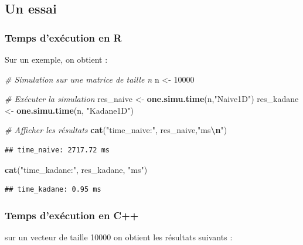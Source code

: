 \documentclass[
]{article}
\newenvironment{Shaded}{\begin{snugshade}}{\end{snugshade}}
\newcommand{\CommentTok}[1]{\textcolor[rgb]{0.56,0.35,0.01}{\textit{#1}}}
\newcommand{\DecValTok}[1]{\textcolor[rgb]{0.00,0.00,0.81}{#1}}
\newcommand{\FunctionTok}[1]{\textcolor[rgb]{0.13,0.29,0.53}{\textbf{#1}}}
\newcommand{\NormalTok}[1]{#1}
\newcommand{\OtherTok}[1]{\textcolor[rgb]{0.56,0.35,0.01}{#1}}
\newcommand{\SpecialCharTok}[1]{\textcolor[rgb]{0.81,0.36,0.00}{\textbf{#1}}}
\newcommand{\StringTok}[1]{\textcolor[rgb]{0.31,0.60,0.02}{#1}}
\begin{document}
\subsection{Un essai}\label{un-essai}

\subsubsection{Temps d'exécution en R}\label{temps-dexuxe9cution-en-r}

Sur un exemple, on obtient :

\begin{Shaded}
\begin{Highlighting}[]
\CommentTok{\# Simulation sur une matrice de taille n}
\NormalTok{n }\OtherTok{\textless{}{-}} \DecValTok{10000}

\CommentTok{\# Exécuter la simulation}
\NormalTok{res\_naive }\OtherTok{\textless{}{-}} \FunctionTok{one.simu.time}\NormalTok{(n,}\StringTok{"Naive1D"}\NormalTok{)}
\NormalTok{res\_kadane }\OtherTok{\textless{}{-}} \FunctionTok{one.simu.time}\NormalTok{(n, }\StringTok{"Kadane1D"}\NormalTok{)}

\CommentTok{\# Afficher les résultats}
\FunctionTok{cat}\NormalTok{(}\StringTok{"time\_naive:"}\NormalTok{, res\_naive,}\StringTok{"ms}\SpecialCharTok{\textbackslash{}n}\StringTok{"}\NormalTok{)}
\end{Highlighting}
\end{Shaded}

\begin{verbatim}
## time_naive: 2717.72 ms
\end{verbatim}

\begin{Shaded}
\begin{Highlighting}[]
\FunctionTok{cat}\NormalTok{(}\StringTok{"time\_kadane:"}\NormalTok{, res\_kadane, }\StringTok{"ms"}\NormalTok{)}
\end{Highlighting}
\end{Shaded}

\begin{verbatim}
## time_kadane: 0.95 ms
\end{verbatim}

\subsubsection{Temps d'exécution en C++}\label{temps-dexuxe9cution-en-c}

sur un vecteur de taille 10000 on obtient les résultats suivants :
\end{document}
